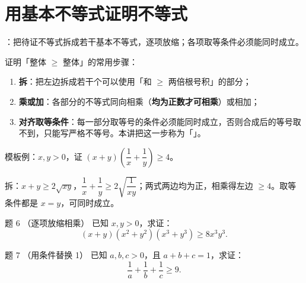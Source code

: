 \section{用基本不等式证明不等式}

\begin{strand}
：把待证不等式拆成若干基本不等式，逐项放缩；各项取等条件必须能同时成立。
\end{strand}


证明「整体 $\ge$ 整体」的常用步骤：
\begin{enumerate}
  \item \textbf{拆}：把左边拆成若干个可以使用「和 $\ge$ 两倍根号积」的部分；
  \item \textbf{乘或加}：各部分的不等式同向相乘（\textbf{均为正数才可相乘}）或相加；
  \item \textbf{对齐取等条件}：每一部分取等号的条件必须能同时成立，否则合成后的等号取不到，只能写严格不等号。本讲把这一步称为「」。
\end{enumerate}

模板例：$x,y>0$，证 $(x+y)\left(\dfrac1x+\dfrac1y\right)\ge 4$。

拆：$x+y\ge 2\sqrt{xy}$，$\dfrac1x+\dfrac1y\ge 2\sqrt{\dfrac{1}{xy}}$；两式两边均为正，相乘得左边 $\ge 4$。取等条件都是 $x=y$，可同时成立。%

\begin{problem}{题 6 （逐项放缩相乘）}
已知 $x,y>0$，求证：
\[
(x+y)(x^2+y^2)(x^3+y^3)\ge 8x^3y^3.
\]
\end{problem}

\begin{problem}{题 7 \starred（用条件替换 1）}
已知 $a,b,c>0$，且 $a+b+c=1$，求证：
\[
\frac{1}{a}+\frac{1}{b}+\frac{1}{c}\ge 9.
\]
\end{problem}

\clearpage
